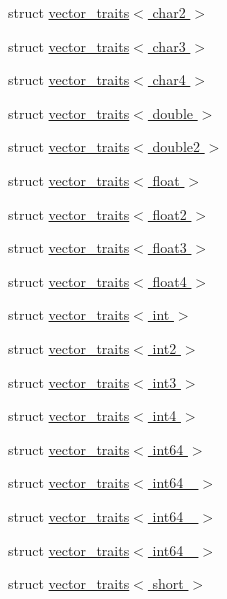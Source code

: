 \begin{DoxyCompactItemize}
struct \hyperlink{structcugar_1_1vector__traits_3_01char2_01_4}{vector\+\_\+traits$<$ char2 $>$}
\item 
struct \hyperlink{structcugar_1_1vector__traits_3_01char3_01_4}{vector\+\_\+traits$<$ char3 $>$}
\item 
struct \hyperlink{structcugar_1_1vector__traits_3_01char4_01_4}{vector\+\_\+traits$<$ char4 $>$}
\item 
struct \hyperlink{structcugar_1_1vector__traits_3_01double_01_4}{vector\+\_\+traits$<$ double $>$}
\item 
struct \hyperlink{structcugar_1_1vector__traits_3_01double2_01_4}{vector\+\_\+traits$<$ double2 $>$}
\item 
struct \hyperlink{structcugar_1_1vector__traits_3_01float_01_4}{vector\+\_\+traits$<$ float $>$}
\item 
struct \hyperlink{structcugar_1_1vector__traits_3_01float2_01_4}{vector\+\_\+traits$<$ float2 $>$}
\item 
struct \hyperlink{structcugar_1_1vector__traits_3_01float3_01_4}{vector\+\_\+traits$<$ float3 $>$}
\item 
struct \hyperlink{structcugar_1_1vector__traits_3_01float4_01_4}{vector\+\_\+traits$<$ float4 $>$}
\item 
struct \hyperlink{structcugar_1_1vector__traits_3_01int_01_4}{vector\+\_\+traits$<$ int $>$}
\item 
struct \hyperlink{structcugar_1_1vector__traits_3_01int2_01_4}{vector\+\_\+traits$<$ int2 $>$}
\item 
struct \hyperlink{structcugar_1_1vector__traits_3_01int3_01_4}{vector\+\_\+traits$<$ int3 $>$}
\item 
struct \hyperlink{structcugar_1_1vector__traits_3_01int4_01_4}{vector\+\_\+traits$<$ int4 $>$}
\item 
struct \hyperlink{structcugar_1_1vector__traits_3_01int64_01_4}{vector\+\_\+traits$<$ int64 $>$}
\item 
struct \hyperlink{structcugar_1_1vector__traits_3_01int64__2_01_4}{vector\+\_\+traits$<$ int64\+\_ $>$}
\item 
struct \hyperlink{structcugar_1_1vector__traits_3_01int64__3_01_4}{vector\+\_\+traits$<$ int64\+\_ $>$}
\item 
struct \hyperlink{structcugar_1_1vector__traits_3_01int64__4_01_4}{vector\+\_\+traits$<$ int64\+\_ $>$}
\item 
struct \hyperlink{structcugar_1_1vector__traits_3_01short_01_4}{vector\+\_\+traits$<$ short $>$}
\item 

\end{DoxyCompactItemize}
